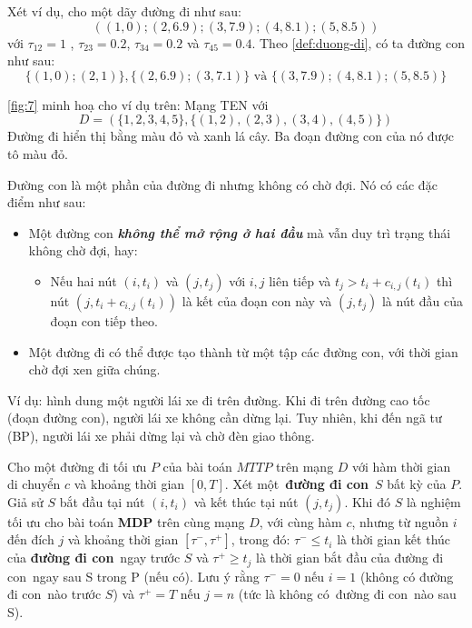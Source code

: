 \documentclass[../main.tex]{subfiles}
\begin{document}
Xét ví dụ, cho một dãy đường đi như sau:
\[((1,0);(2,6.9);(3,7.9);(4,8.1);(5,8.5))\] với \(\tau_{12} = 1\) ,
\(\tau_{23} = 0.2\), \(\tau_{34} = 0.2\) và \(\tau_{45} = 0.4\). Theo
\autoref{def:duong-di}, có ta đường con như sau: \[\{(1, 0); (2, 1)\}, \{(2, 6.9); (3, 7.1)\} \text{ và } \{(3, 7.9); (4, 8.1); (5, 8.5)\}\] 

\autoref{fig:7} minh hoạ cho ví dụ trên: Mạng TEN với
\[D = (\{1, 2, 3, 4, 5\}, \{(1, 2), (2, 3), (3, 4), (4, 5)\})\] 
Đường đi hiển thị bằng màu đỏ và xanh lá cây. 
Ba đoạn đường con của nó được tô màu đỏ.

Đường con là một phần của đường đi nhưng không có chờ đợi. Nó có các đặc
điểm như sau:

\begin{itemize}
\tightlist
\item
  Một đường con \textbf{\emph{không thể mở rộng ở hai đầu}} mà vẫn duy
  trì trạng thái không chờ đợi, hay:

  \begin{itemize}
  \tightlist
  \item
    Nếu hai nút \((i, t_i)\) và \((j, t_j)\) với \(i, j\) liên tiếp và
    \(t_j > t_i+c_{i,j}(t_i)\) thì nút \((j,t_i + c_{i,j}(t_i))\) là kết
    của đoạn con này và \((j, t_j)\) là nút đầu của đoạn con tiếp theo.
  \end{itemize}
\item
  Một đường đi có thể được tạo thành từ một tập các đường con, với thời
  gian chờ đợi xen giữa chúng.
\end{itemize}

Ví dụ: hình dung một người lái xe đi trên đường. Khi đi trên đường cao
tốc (đoạn đường con), người lái xe không cần dừng lại. Tuy nhiên, khi
đến ngã tư (BP), người lái xe phải dừng lại và chờ đèn giao
thông.

\begin{lemma}
\label{lem:toi-uu}
Cho một đường đi tối ưu
\(P\) của bài toán \(MTTP\) trên mạng \(D\) với hàm thời gian di chuyển
\(c\) và khoảng thời gian \([0,T]\). Xét một~\textbf{đường đi con}~\(S\)
bất kỳ của \(P\). Giả sử \(S\) bắt đầu tại nút \((i,t_i)\) và kết thúc
tại nút \((j,t_j)\). Khi đó \(S\) là nghiệm tối ưu cho bài toán
\textbf{MDP} trên cùng mạng \(D\), với cùng hàm \(c\), nhưng từ nguồn
\(i\) đến đích \(j\) và khoảng thời gian \([\tau^−,\tau^+]\), trong đó:
\(\tau^− \le t_i\) là thời gian kết thúc của \textbf{đường đi con}~ngay
trước \(S\) và \(\tau^+ \ge t_j\) là thời gian bắt đầu của đường đi
con~ngay sau S trong P (nếu có). Lưu ý rằng \(\tau^− = 0\) nếu \(i = 1\)
(không có đường đi con~nào trước \(S\)) và \(\tau^+ = T\) nếu \(j = n\)
(tức là không có~đường đi con~nào sau S).
\end{lemma}
\end{document}
